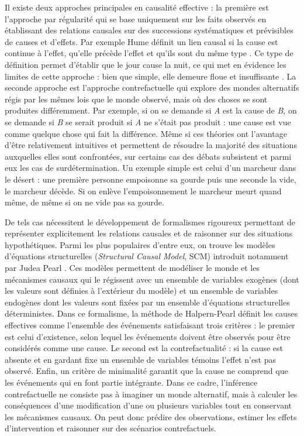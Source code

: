 Il existe deux approches principales en causalité effective : la première est l'approche par régularité qui se base uniquement sur les faits observés en établissant des relations causales sur des successions systématiques et prévisibles de causes et d'effets. Par exemple Hume définit un lien causal si la cause est continue à l'effet, qu'elle précède l'effet et qu'ils sont du même type \parencite{enwikisource:hume}. Ce type de définition permet d'établir que le jour cause la nuit, ce qui met en évidence les limites de cette approche : bien que simple, elle demeure floue et insuffisante \parencite{kueffner_comprehensive_2021}. La seconde approche est l'approche contrefactuelle qui explore des mondes alternatifs régis par les mêmes lois que le monde observé, mais où des choses se sont produites différemment. Par exemple, si on se demande si \textit{A} est la cause de \textit{B}, on se demande si \textit{B} se serait produit si \textit{A} ne s'était pas produit : une cause est vue comme quelque chose qui fait la différence. Même si ces théories ont l'avantage d'être relativement intuitives et permettent de résoudre la majorité des situations auxquelles elles sont confrontées, sur certains cas des débats subsistent et parmi eux les cas de surdétermination. Un exemple simple est celui d'un marcheur dans le désert : une première personne empoisonne sa gourde puis une seconde la vide, le marcheur décède. Si on enlève l'empoisonnement le marcheur meurt quand même, de même si on ne  vide pas sa gourde.

De tels cas nécessitent le développement de formalismes rigoureux permettant de représenter explicitement les relations causales et de raisonner sur des situations hypothétiques. Parmi les plus populaires d'entre eux, on trouve les modèles d'équations structurelles (\textit{Structural Causal Model}, SCM) introduit notamment par Judea Pearl \parencite{pearl2009causality}. Ces modèles permettent de modéliser le monde et les mécanismes causaux qui le régissent avec un ensemble de variables exogènes (dont les valeurs sont définies à l'extérieur du modèle) et un ensemble de variables endogènes dont les valeurs sont fixées par un ensemble d'équations structurelles déterministes. Dans ce formalisme, la méthode de Halpern-Pearl définit les causes effectives comme l'ensemble des événements satisfaisant trois critères \parencite{halpern2016actual} : le premier est celui d'existence, selon lequel les événements doivent être observés pour être considérés comme une cause. Le second est la contrefactualité : si la cause est absente et en gardant fixe un ensemble de variables témoins l'effet n'est pas observé. Enfin, un critère de minimalité garantit que la cause ne comprend que les événements qui en font partie intégrante. Dans ce cadre, l'inférence contrefactuelle ne consiste pas à imaginer un monde alternatif, mais à calculer les conséquences d'une modification d'une ou plusieurs variables tout en conservant les mécanismes causaux. On peut donc prédire des observations, estimer les effets d'intervention et raisonner sur des scénarios contrefactuels. 

